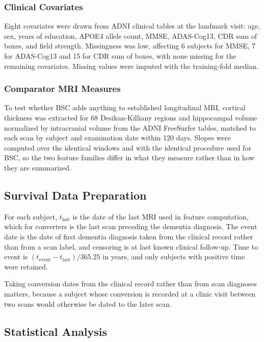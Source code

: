 \documentclass[blue]{ludusofficial}  %
\begin{document}
\subsubsection{Clinical Covariates}

Eight covariates were drawn from ADNI clinical tables at the landmark visit: age, sex, years of education, APOE4 allele count, MMSE, ADAS-Cog13, CDR sum of boxes, and field strength. Missingness was low, affecting 6 subjects for MMSE, 7 for ADAS-Cog13 and 15 for CDR sum of boxes, with none missing for the remaining covariates. Missing values were imputed with the training-fold median.

\subsubsection{Comparator MRI Measures}

To test whether BSC adds anything to established longitudinal MRI, cortical thickness was extracted for 68 Desikan-Killiany regions and hippocampal volume normalized by intracranial volume from the ADNI FreeSurfer tables, matched to each scan by subject and examination date within 120 days. Slopes were computed over the identical windows and with the identical procedure used for BSC, so the two feature families differ in what they measure rather than in how they are summarized.

\subsection{Survival Data Preparation}

For each subject, $t_{\text{last}}$ is the date of the last MRI used in feature computation, which for converters is the last scan preceding the dementia diagnosis. The event date is the date of first dementia diagnosis taken from the clinical record rather than from a scan label, and censoring is at last known clinical follow-up. Time to event is $(t_{\text{event}} - t_{\text{last}})/365.25$ in years, and only subjects with positive time were retained.

Taking conversion dates from the clinical record rather than from scan diagnoses matters, because a subject whose conversion is recorded at a clinic visit between two scans would otherwise be dated to the later scan.

\subsection{Statistical Analysis}
\end{document}
